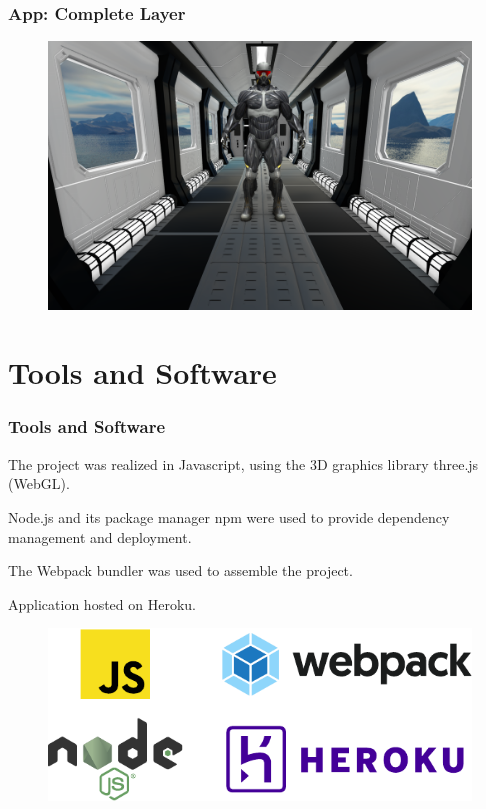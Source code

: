 \documentclass{beamer}
\newcommand{\redtext}[1]{\textcolor{myred}{#1}}
\begin{document}
\begin{frame}
\frametitle{App: Complete Layer}
\begin{figure}
    \centering
    \includegraphics[width=\resultwidth]{images/app_complete}
\end{figure}

\end{frame}

\section{Tools and Software}
\begin{frame}
\frametitle{Tools and Software}
The project was realized in \redtext{Javascript}, using the 3D graphics library \redtext{three.js} (\redtext{WebGL}).

\redtext{Node.js} and its package manager \redtext{npm} were used to provide dependency management and deployment.

The \redtext{Webpack} bundler was used to assemble the project.

Application hosted on \redtext{Heroku}.
\begin{figure}
    \centering
    \includegraphics[width=0.6\linewidth]{images/software_logos.pdf}
\end{figure}


\end{frame}
\end{document}
